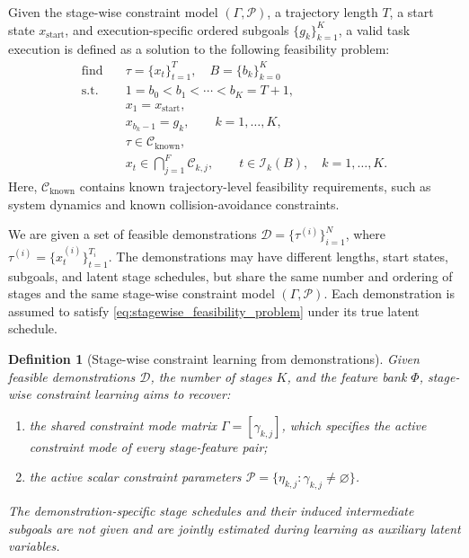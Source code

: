 \documentclass[lettersize,journal]{IEEEtran}
\newtheorem{definition}{Definition}
\begin{document}
Given the stage-wise constraint model $(\Gamma,\mathcal{P})$, a trajectory length $T$, a start state $x_{\mathrm{start}}$, and execution-specific ordered subgoals $\{g_k\}_{k=1}^{K}$, a valid task execution is defined as a solution to the following feasibility problem:
\begin{equation}
\begin{aligned}
\text{find}\quad
& \tau=\{x_t\}_{t=1}^{T},\quad B=\{b_k\}_{k=0}^{K} \\
\text{s.t.}\quad
& 1=b_0<b_1<\cdots<b_K=T+1,\\
& x_1=x_{\mathrm{start}},\\
& x_{b_k-1}=g_k,
\qquad k=1,\dots,K,\\
& \tau\in\mathcal{C}_{\mathrm{known}},\\
& x_t\in\bigcap_{j=1}^{F}\mathcal{C}_{k,j},
\qquad
t\in\mathcal{I}_k(B),\quad k=1,\dots,K.
\end{aligned}
\label{eq:stagewise_feasibility_problem}
\end{equation}
Here, $\mathcal{C}_{\mathrm{known}}$ contains known trajectory-level feasibility requirements, such as system dynamics and known collision-avoidance constraints.

We are given a set of feasible demonstrations $\mathcal{D}=\{\tau^{(i)}\}_{i=1}^{N}$, where $\tau^{(i)}=\{x_t^{(i)}\}_{t=1}^{T_i}$. The demonstrations may have different lengths, start states, subgoals, and latent stage schedules, but share the same number and ordering of stages and the same stage-wise constraint model $(\Gamma,\mathcal{P})$. Each demonstration is assumed to satisfy \eqref{eq:stagewise_feasibility_problem} under its true latent schedule.

\begin{definition}[Stage-wise constraint learning from demonstrations]
Given feasible demonstrations $\mathcal{D}$, the number of stages $K$, and the feature bank $\Phi$, stage-wise constraint learning aims to recover:
\begin{enumerate}
    \item the shared constraint mode matrix $\Gamma=[\gamma_{k,j}]$, which specifies the active constraint mode of every stage-feature pair;
    \item the active scalar constraint parameters $\mathcal{P}=\{\eta_{k,j}:\gamma_{k,j}\neq\varnothing\}$.
\end{enumerate}
The demonstration-specific stage schedules and their induced intermediate subgoals are not given and are jointly estimated during learning as auxiliary latent variables.
\end{definition}
\end{document}

